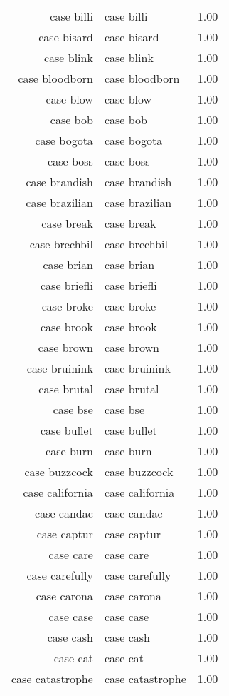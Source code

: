 \begin{table}[ht]
\begin{tabular}{rlr}
  case billi & case billi & 1.00 \\ 
  case bisard & case bisard & 1.00 \\ 
  case blink & case blink & 1.00 \\ 
  case bloodborn & case bloodborn & 1.00 \\ 
  case blow & case blow & 1.00 \\ 
  case bob & case bob & 1.00 \\ 
  case bogota & case bogota & 1.00 \\ 
  case boss & case boss & 1.00 \\ 
  case brandish & case brandish & 1.00 \\ 
  case brazilian & case brazilian & 1.00 \\ 
  case break & case break & 1.00 \\ 
  case brechbil & case brechbil & 1.00 \\ 
  case brian & case brian & 1.00 \\ 
  case briefli & case briefli & 1.00 \\ 
  case broke & case broke & 1.00 \\ 
  case brook & case brook & 1.00 \\ 
  case brown & case brown & 1.00 \\ 
  case bruinink & case bruinink & 1.00 \\ 
  case brutal & case brutal & 1.00 \\ 
  case bse & case bse & 1.00 \\ 
  case bullet & case bullet & 1.00 \\ 
  case burn & case burn & 1.00 \\ 
  case buzzcock & case buzzcock & 1.00 \\ 
  case california & case california & 1.00 \\ 
  case candac & case candac & 1.00 \\ 
  case captur & case captur & 1.00 \\ 
  case care & case care & 1.00 \\ 
  case carefully & case carefully & 1.00 \\ 
  case carona & case carona & 1.00 \\ 
  case case & case case & 1.00 \\ 
  case cash & case cash & 1.00 \\ 
  case cat & case cat & 1.00 \\ 
  case catastrophe & case catastrophe & 1.00 \\ 

\end{tabular}
\end{table}
